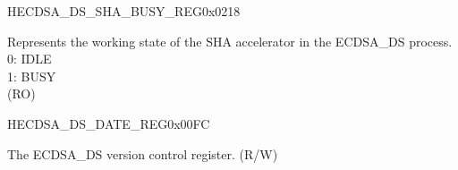 \begin{register}{H}{ECDSA\_DS\_SHA\_BUSY\_REG}{0x0218}\label{regdesc:ECDSADSSHABUSYREG}
%
%
\regnewline%
\begin{regdesc}\begin{reglist}
\label{fielddesc:ECDSADSSHABUSY}\item [ECDSA\_DS\_SHA\_BUSY] Represents the working state of the SHA accelerator in the ECDSA\_DS process.\\
0: IDLE\\
1: BUSY\\
(RO)
\end{reglist}\end{regdesc}
\end{register}


\begin{register}{H}{ECDSA\_DS\_DATE\_REG}{0x00FC}\label{regdesc:ECDSADSDATEREG}
%
%
\regnewline%
\begin{regdesc}\begin{reglist}
\label{fielddesc:ECDSADSDATE}\item [ECDSA\_DS\_DATE] The ECDSA\_DS version control register. (R/W)
\end{reglist}\end{regdesc}
\end{register}
